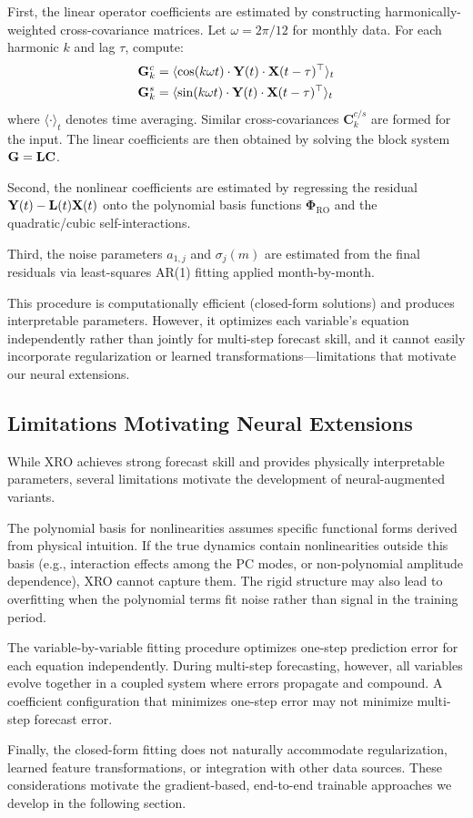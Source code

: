 First, the linear operator coefficients are estimated by constructing harmonically-weighted cross-covariance matrices. Let $\omega = 2\pi/12$ for monthly data. For each harmonic $k$ and lag $\tau$, compute:
\begin{align}
    \mathbf{G}_k^c &= \langle \cos(k\omega t) \cdot \mathbf{Y}(t) \cdot \mathbf{X}(t-\tau)^\top \rangle_t \\
    \mathbf{G}_k^s &= \langle \sin(k\omega t) \cdot \mathbf{Y}(t) \cdot \mathbf{X}(t-\tau)^\top \rangle_t
\end{align}
where $\langle \cdot \rangle_t$ denotes time averaging. Similar cross-covariances $\mathbf{C}_k^{c/s}$ are formed for the input. The linear coefficients are then obtained by solving the block system $\mathbf{G} = \mathbf{L} \mathbf{C}$.

Second, the nonlinear coefficients are estimated by regressing the residual $\mathbf{Y}(t) - \mathbf{L}(t)\mathbf{X}(t)$ onto the polynomial basis functions $\boldsymbol{\Phi}_{\text{RO}}$ and the quadratic/cubic self-interactions.

Third, the noise parameters $a_{1,j}$ and $\sigma_j(m)$ are estimated from the final residuals via least-squares AR(1) fitting applied month-by-month.

This procedure is computationally efficient (closed-form solutions) and produces interpretable parameters. However, it optimizes each variable's equation independently rather than jointly for multi-step forecast skill, and it cannot easily incorporate regularization or learned transformations---limitations that motivate our neural extensions.

\subsection{Limitations Motivating Neural Extensions}

While XRO achieves strong forecast skill and provides physically interpretable parameters, several limitations motivate the development of neural-augmented variants.

The polynomial basis for nonlinearities assumes specific functional forms derived from physical intuition. If the true dynamics contain nonlinearities outside this basis (e.g., interaction effects among the PC modes, or non-polynomial amplitude dependence), XRO cannot capture them. The rigid structure may also lead to overfitting when the polynomial terms fit noise rather than signal in the training period.

The variable-by-variable fitting procedure optimizes one-step prediction error for each equation independently. During multi-step forecasting, however, all variables evolve together in a coupled system where errors propagate and compound. A coefficient configuration that minimizes one-step error may not minimize multi-step forecast error.

Finally, the closed-form fitting does not naturally accommodate regularization, learned feature transformations, or integration with other data sources. These considerations motivate the gradient-based, end-to-end trainable approaches we develop in the following section.
